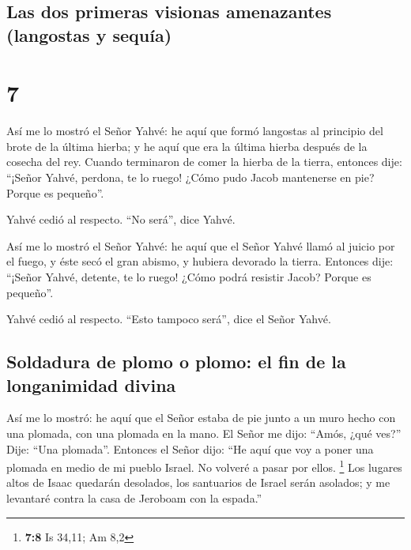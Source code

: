 \hypertarget{las-dos-primeras-visionas-amenazantes-langostas-y-sequuxeda}{%
\subsection{Las dos primeras visionas amenazantes (langostas y
sequía)}\label{las-dos-primeras-visionas-amenazantes-langostas-y-sequuxeda}}

\hypertarget{section-6}{%
\section{7}\label{section-6}}

 Así me lo mostró el Señor Yahvé: he aquí que formó
langostas al principio del brote de la última hierba; y he aquí que era
la última hierba después de la cosecha del rey.  Cuando
terminaron de comer la hierba de la tierra, entonces dije: ``¡Señor
Yahvé, perdona, te lo ruego! ¿Cómo pudo Jacob mantenerse en pie? Porque
es pequeño''.

 Yahvé cedió al respecto. ``No será'', dice Yahvé.

 Así me lo mostró el Señor Yahvé: he aquí que el Señor
Yahvé llamó al juicio por el fuego, y éste secó el gran abismo, y
hubiera devorado la tierra.  Entonces dije: ``¡Señor
Yahvé, detente, te lo ruego! ¿Cómo podrá resistir Jacob? Porque es
pequeño''.

 Yahvé cedió al respecto. ``Esto tampoco será'', dice el
Señor Yahvé.

\hypertarget{soldadura-de-plomo-o-plomo-el-fin-de-la-longanimidad-divina}{%
\subsection{Soldadura de plomo o plomo: el fin de la longanimidad
divina}\label{soldadura-de-plomo-o-plomo-el-fin-de-la-longanimidad-divina}}

 Así me lo mostró: he aquí que el Señor estaba de pie
junto a un muro hecho con una plomada, con una plomada en la mano.
 El Señor me dijo: ``Amós, ¿qué ves?'' Dije: ``Una
plomada''. Entonces el Señor dijo: ``He aquí que voy a poner una plomada
en medio de mi pueblo Israel. No volveré a pasar por ellos. \footnote{\textbf{7:8}
  Is 34,11; Am 8,2}  Los lugares altos de Isaac quedarán
desolados, los santuarios de Israel serán asolados; y me levantaré
contra la casa de Jeroboam con la espada.''

